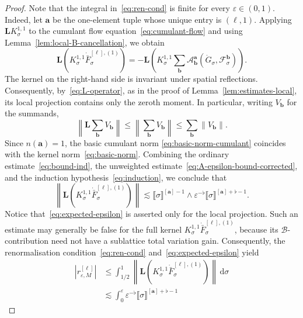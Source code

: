 \documentclass{article}
\numberwithin{equation}{section}
\newcommand{\mathd}{\mathrm{d}}
\theoremstyle{plain}
\theoremstyle{definition}
\begin{document}
\begin{proof}
  Note that the integral in~\eqref{eq:ren-cond} is finite for every $\varepsilon\in(0,1)$.
  Indeed, let $\boldsymbol a$ be the one-element tuple whose unique entry is
  $(\ell,1)$. Applying $\boldsymbol L K^{1,1}_\sigma$ to the cumulant flow
  equation~\eqref{eq:cumulant-flow} and using
  Lemma~\ref{lem:local-B-cancellation}, we obtain
  \[
    \boldsymbol L
    (K^{1,1}_\sigma\dot{\bar F}^{[\ell],(1)}_\sigma)
    =-
    \boldsymbol L\left(
      K^{1,1}_\sigma
      \sum_{\boldsymbol b}
      \mathcal A^{\boldsymbol a}_{\boldsymbol b}
      (\dot G_\sigma,\mathcal F^{\boldsymbol b}_\sigma)
    \right).
  \]
  The kernel on the right-hand side is invariant under spatial reflections.
  Consequently, by~\eqref{eq:L-operator}, as in the proof of
  Lemma~\ref{lem:estimates-local}, its local projection contains only the
  zeroth moment. In particular, writing $V_{\boldsymbol b}$ for the summands,
  \[
    \left\|\boldsymbol L\sum_{\boldsymbol b}V_{\boldsymbol b}\right\|
    \leqslant
    \left\|\sum_{\boldsymbol b}V_{\boldsymbol b}\right\|
    \leqslant
    \sum_{\boldsymbol b}\|V_{\boldsymbol b}\|.
  \]
  Since $n(\boldsymbol a)=1$, the basic cumulant norm
  \eqref{eq:basic-norm-cumulant} coincides with the kernel
  norm~\eqref{eq:basic-norm}.
  Combining the ordinary estimate~\eqref{eq:bound-ind}, the
  unweighted estimate~\eqref{eq:A-epsilon-bound-corrected}, and the induction
  hypothesis~\eqref{eq:induction}, we conclude that
  \begin{equation}
    \left\|
      \boldsymbol L
      (K^{1,1}_\sigma\dot{\bar F}^{[\ell],(1)}_\sigma)
    \right\|
    \lesssim
    \llbracket\sigma\rrbracket^{[\boldsymbol a]-1}
    \wedge
    \varepsilon^{-\flat}
    \llbracket\sigma\rrbracket^{[\boldsymbol a]+\flat-1}.
    \label{eq:expected-epsilon}
  \end{equation}
  Notice that~\eqref{eq:expected-epsilon} is asserted only for the local
  projection. Such an estimate may generally be false for the full kernel
  $K^{1,1}_\sigma\dot{\bar F}^{[\ell],(1)}_\sigma$, because its
  $\mathcal B$-contribution need not have a sublattice total variation gain.
  Consequently,
  the renormalisation condition~\eqref{eq:ren-cond} and~\eqref{eq:expected-epsilon} yield
  \begin{align*}
    |r^{[\ell]}_{\varepsilon,M}|
    &\leqslant
    \int_{1/2}^1
    \left\|
      \boldsymbol L
      (K^{1,1}_\sigma\dot{\bar F}^{[\ell],(1)}_\sigma)
    \right\|\,\mathd\sigma
    \\
    &\lesssim
    \int_0^\varepsilon
    \varepsilon^{-\flat}
    \llbracket\sigma\rrbracket^{[\boldsymbol a]+\flat-1}

\end{align*}
\end{proof}
\end{document}
